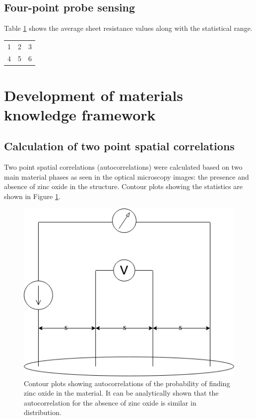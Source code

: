 \subsection{Four-point probe sensing}

Table \ref{tab:fps} shows the average sheet resistance values along with the statistical range.

\begin{table}
  \centering
  \begin{tabular}{ c c c }
    \hline
    \hline
    1 & 2 & 3 \\
    4 & 5 & 6 \\
    \hline
  \end{tabular}
  \label{tab:fps}
\end{table}

\section{Development of materials knowledge framework}
\subsection{Calculation of two point spatial correlations}

Two point spatial correlations (autocorrelations) were calculated based on two main material phases as seen in the optical microscopy images: the presence and absence of zinc oxide in the structure.
Contour plots showing the statistics are shown in Figure \ref{fig:spat}.

\begin{figure}
  \centering
  \includegraphics[scale=0.4]{FourPoint.png}
  \caption[Contour plots of autocorrelations]{Contour plots showing autocorrelations of the probability of finding zinc oxide in the material. It can be analytically shown that the autocorrelation for the absence of zinc oxide is similar in distribution.}
  \label{fig:spat}
\end{figure}

